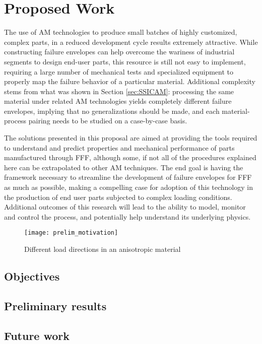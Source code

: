 \documentclass[main.tex]{subfiles}
\begin{document}
\chapter{Proposed Work} \label{ch:proposal}


The use of AM technologies to produce small batches of highly customized, complex parts, in a reduced development cycle results extremely attractive. While constructing failure envelopes can help overcome the wariness of industrial segments to design end-user parts, this resource is still not easy to implement, requiring a large number of mechanical tests and specialized equipment to properly map the failure behavior of a particular material. Additional complexity stems from what was shown in Section \ref{sec:SSICAM}: processing the same material under related AM technologies yields completely different failure envelopes, implying that no generalizations should be made, and each material-process pairing needs to be studied on a case-by-case basis.

The solutions presented in this proposal are aimed at providing the tools required to understand and predict properties and mechanical performance of parts manufactured through FFF, although some, if not all of the procedures explained here can be extrapolated to other AM techniques. The end goal is having the framework necessary to streamline the development of failure envelopes for FFF as much as possible, making a compelling case for adoption of this technology in the production of end user parts subjected to complex loading conditions. Additional outcomes of this research will lead to the ability to model, monitor and control the process, and potentially help understand its underlying physics.

\begin{figure}[h]
	\center
	\texttt{[image: prelim\_motivation]}
	\caption{Different load directions in an anisotropic material} \label{fig:triangle}
\end{figure}
  

\section{Objectives} \label{sec:objectives}
\section{Preliminary results} \label{sec:prelim}
\section{Future work} \label{sec:fw}



% 

\end{document}
